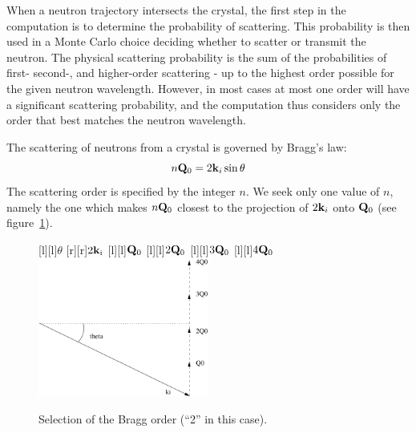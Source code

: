 When a neutron trajectory intersects the crystal, the first step in the
computation is to determine the probability of scattering. This
probability is then used in a Monte Carlo choice deciding whether to
scatter or transmit the neutron. The physical scattering probability is the sum
of the probabilities of first- second-, and higher-order scattering -
up to the highest order possible for the given neutron wavelength.
However, in most cases at most one order will have a
significant scattering probability, and the computation thus considers
only the order that best matches the neutron wavelength.

The scattering of neutrons from a crystal is governed by Bragg's law:
\begin{equation}
n{\bf Q}_0 = 2{\bf k}_i\sin\theta
\end{equation}
The scattering order is specified by the integer $n$. We seek only one
value of $n$, namely the one which makes
$n {\bf Q}_0$ closest to the projection of $2{\bf k}_i$ onto ${\bf Q}_0$
(see figure~\ref{f:mosaic_order}).
%
%
\begin{figure}
  \begin{center}
    [l][l]{$\theta$}
    [r][r]{$2{\bf k}_{\rm i}$}
    [l][l]{${\bf Q}_0$}
    [l][l]{$2{\bf Q}_0$}
    [l][l]{$3{\bf Q}_0$}
    [l][l]{$4{\bf Q}_0$}
    \includegraphics[width=0.5\textwidth]{figures/mosaic_order}
  \end{center}
\caption{Selection of the Bragg order (``2'' in this case).}
\label{f:mosaic_order}
\end{figure}
%

